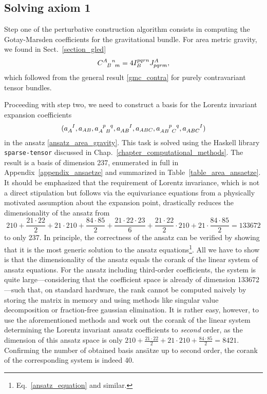 \subsection{Solving axiom 1}\label{sect_area_lagrangian}
Step one of the perturbative construction algorithm consists in computing the Gotay-Marsden coefficients for the gravitational bundle. For area metric gravity, we found in Sect.~\ref{section_gled}
\begin{equation*}
  \gmc{A}{B}{n}{m} = 4 I^{pqrn}_B J^A_{pqrm},
\end{equation*}
which followed from the general result \eqref{gmc_contra} for purely contravariant tensor bundles.

Proceeding with step two, we need to construct a basis for the Lorentz invariant expansion coefficients
\begin{equation}
  (a_A^{\hphantom AI}, a_{AB}, a_{A\hphantom pB}^{\hphantom Ap\hphantom Bq}, a_{AB}^{\hphantom{AB}I}, a_{ABC}, a_{AB\hphantom pC}^{\hphantom{AB}p\hphantom Cq}, a_{ABC}^{\hphantom{ABC}I})
\end{equation}
in the ansatz \eqref{ansatz_area_gravity}. This task is solved using the Haskell library \texttt{sparse-tensor} \cite{Reinhart_2019_sparse-tensor} discussed in Chap.~\ref{chapter_computational_methods}. The result is a basis of dimension 237, enumerated in full in Appendix~\ref{appendix_ansaetze} and summarized in Table~\ref{table_area_ansaetze}. It should be emphasized that the requirement of Lorentz invariance, which is not a direct stipulation but follows via the equivariance equations from a physically motivated assumption about the expansion point, drastically reduces the dimensionality of the ansatz from
\begin{equation*}
  210 + \frac{21\cdot 22}{2} + 21\cdot 210 + \frac{84\cdot 85}{2} + \frac{21\cdot 22\cdot 23}{6} + \frac{21\cdot 22}{2} \cdot  210 + 21\cdot\frac{84\cdot 85}{2} = 133672
\end{equation*}
to only 237. In principle, the correctness of the ansatz can be verified by showing that it is the most generic solution to the ansatz equations\footnote{Eq.~\eqref{ansatz_equation} and similar.}. All we have to show is that the dimensionality of the ansatz equals the corank of the linear system of ansatz equations. For the ansatz including third-order coefficients, the system is quite large---considering that the coefficient space is already of dimension 133672---such that, on standard hardware, the rank cannot be computed naively by storing the matrix in memory and using methods like singular value decomposition or fraction-free gaussian elimination. It is rather easy, however, to use the aforementioned methods and work out the corank of the linear system determining the Lorentz invariant ansatz coefficients to \emph{second} order, as the dimension of this ansatz space is only $210 + \frac{21\cdot 22}{2} + 21 \cdot 210 + \frac{84\cdot 85}{2} = 8421$. Confirming the number of obtained basis ansätze up to second order, the corank of the corresponding system is indeed 40.
